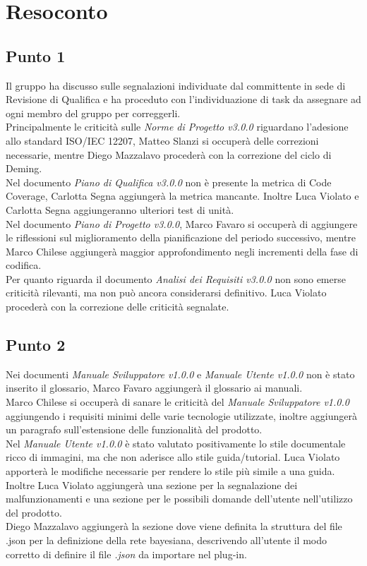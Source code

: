 \section{Resoconto}

\subsection{Punto 1}
Il gruppo ha discusso sulle segnalazioni individuate dal committente in sede di Revisione di Qualifica e ha proceduto con l'individuazione di task da assegnare ad ogni membro del gruppo per correggerli.
\\
Principalmente le criticità sulle \textit{Norme di Progetto v3.0.0} riguardano l'adesione allo standard ISO/IEC 12207, Matteo Slanzi si occuperà delle correzioni necessarie, mentre Diego Mazzalavo procederà con la correzione del ciclo di Deming. \\
Nel documento  \textit{Piano di Qualifica v3.0.0} non è presente la metrica di Code Coverage, Carlotta Segna aggiungerà la metrica mancante. Inoltre Luca Violato e Carlotta Segna aggiungeranno ulteriori test di unità. \\
Nel documento \textit{Piano di Progetto v3.0.0}, Marco Favaro si occuperà di aggiungere le riflessioni sul miglioramento della pianificazione del periodo successivo, mentre Marco Chilese aggiungerà maggior approfondimento negli incrementi della fase di codifica. \\
Per quanto riguarda il documento \textit{Analisi dei Requisiti v3.0.0} non sono emerse criticità rilevanti, ma non può ancora considerarsi definitivo. Luca Violato procederà con la correzione delle criticità segnalate.

\subsection{Punto 2}
Nei documenti \textit{Manuale Sviluppatore v1.0.0} e \textit{Manuale Utente v1.0.0} non è stato inserito il glossario, Marco Favaro aggiungerà il glossario ai manuali. \\
Marco Chilese si occuperà di sanare le criticità del \textit{Manuale Sviluppatore v1.0.0} aggiungendo i requisiti minimi delle varie tecnologie utilizzate, inoltre aggiungerà un paragrafo sull'estensione delle funzionalità del prodotto. \\
Nel \textit{Manuale Utente v1.0.0} è stato valutato positivamente lo stile documentale ricco di immagini, ma che non aderisce allo stile guida/tutorial. Luca Violato apporterà le modifiche necessarie per rendere lo stile più simile a una guida. Inoltre Luca Violato aggiungerà una sezione per la segnalazione dei malfunzionamenti e una sezione per le possibili domande dell'utente nell'utilizzo del prodotto. \\
Diego Mazzalavo aggiungerà la sezione dove viene definita la struttura del file .json per la definizione della rete bayesiana, descrivendo all'utente il modo corretto di definire il file \textit{.json} da importare nel plug-in.  

